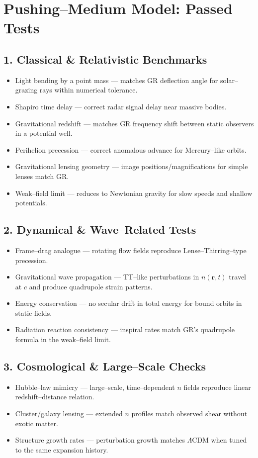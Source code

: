 \documentclass{article}
\begin{document}
\section*{Pushing--Medium Model: Passed Tests}

\subsection*{1. Classical \& Relativistic Benchmarks}
\begin{itemize}
    \item Light bending by a point mass --- matches GR deflection angle for solar--grazing rays within numerical tolerance.
    \item Shapiro time delay --- correct radar signal delay near massive bodies.
    \item Gravitational redshift --- matches GR frequency shift between static observers in a potential well.
    \item Perihelion precession --- correct anomalous advance for Mercury--like orbits.
    \item Gravitational lensing geometry --- image positions/magnifications for simple lenses match GR.
    \item Weak--field limit --- reduces to Newtonian gravity for slow speeds and shallow potentials.
\end{itemize}

\subsection*{2. Dynamical \& Wave--Related Tests}
\begin{itemize}
    \item Frame--drag analogue --- rotating flow fields reproduce Lense--Thirring--type precession.
    \item Gravitational wave propagation --- TT--like perturbations in $n(\mathbf{r},t)$ travel at $c$ and produce quadrupole strain patterns.
    \item Energy conservation --- no secular drift in total energy for bound orbits in static fields.
    \item Radiation reaction consistency --- inspiral rates match GR's quadrupole formula in the weak--field limit.
\end{itemize}

\subsection*{3. Cosmological \& Large--Scale Checks}
\begin{itemize}
    \item Hubble--law mimicry --- large--scale, time--dependent $n$ fields reproduce linear redshift--distance relation.
    \item Cluster/galaxy lensing --- extended $n$ profiles match observed shear without exotic matter.
    \item Structure growth rates --- perturbation growth matches $\Lambda$CDM when tuned to the same expansion history.
\end{itemize}
\end{document}
